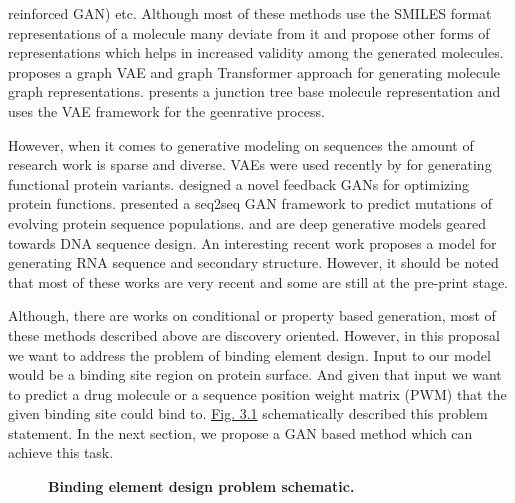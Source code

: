 reinforced GAN) etc. Although most of these methods use the SMILES format representations of a
molecule many deviate from it and propose other forms of representations which helps in increased
validity among the generated molecules. \citet{mitton2021graph} proposes a graph VAE and graph
Transformer \citep{vaswani2017attention} approach for generating molecule graph representations.
\citet{jin2018junction} presents a junction tree base molecule representation and uses the VAE
framework for the geenrative process.
\par
However, when it comes to generative modeling on sequences the amount of research work is sparse and
diverse. VAEs were used recently by \citet{hawkins2021generating} for generating functional protein
variants. \citet{gupta2018feedback} designed a novel feedback GANs for optimizing protein functions.
\citet{berman2020mutagan} presented a seq2seq GAN framework to predict mutations of evolving protein
sequence populations. \citet{linder2020generative} and \citet{killoran2017generating} are deep
generative models geared towards DNA sequence design. An interesting recent work
\citet{yan2021neural} proposes a model for generating RNA sequence and secondary structure. However,
it should be noted that most of these works are very recent and some are still at the pre-print
stage. 
\par
Although, there are works on conditional or property based generation, most of these methods
described above are discovery oriented. However, in this proposal we want to address the problem of
binding element design. Input to our model would be a binding site region on protein surface. And
given that input we want to predict a drug molecule or a sequence position weight matrix (PWM) that
the given binding site could bind to. \hyperref[fig:design_problem]{Fig. 3.1} schematically
described this problem statement. In the next section, we propose a GAN based method which can
achieve this task.
\begin{center}\begin{figure}
        \caption[Binding element design problem schematic]{\textbf{Binding element design problem
        schematic.}}
        \label{fig:design_problem} \end{figure} \end{center}

